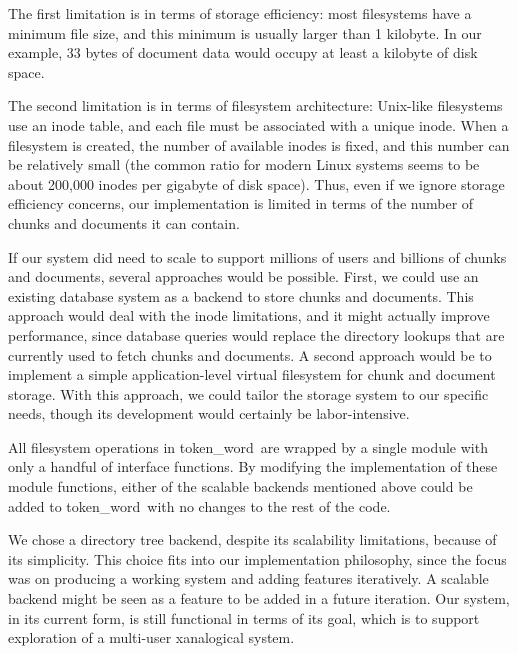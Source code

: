 \documentclass{acm_proc_article-sp}
\newcommand{\tokenWord}{token\_word}
\begin{document}
The first limitation is in terms of storage efficiency:  most filesystems have a minimum file size, and this minimum is usually larger than 1 kilobyte.
In our example, 33 bytes of document data would occupy at least a kilobyte of disk space.

The second limitation is in terms of filesystem architecture:  Unix-like filesystems use an inode table, and each file must be associated with a unique inode.
When a filesystem is created, the number of available inodes is fixed, and this number can be relatively small (the common ratio for modern Linux systems seems to be about 200,000 inodes per gigabyte of disk space). \cite{OperatingSystems}
Thus, even if we ignore storage efficiency concerns, our implementation is limited in terms of the number of chunks and documents it can contain.

If our system did need to scale to support millions of users and billions of chunks and documents, several approaches would be possible.
First, we could use an existing database system as a backend to store chunks and documents.
This approach would deal with the inode limitations, and it might actually improve performance, since database queries would replace the directory lookups that are currently used to fetch chunks and documents.
A second approach would be to implement a simple application-level virtual filesystem for chunk and document storage.
With this approach, we could tailor the storage system to our specific needs, though its development would certainly be labor-intensive.

All filesystem operations in \tokenWord \  are wrapped by a single module with only a handful of interface functions.
By modifying the implementation of these module functions, either of the scalable backends mentioned above could be added to \tokenWord \  with no changes to the rest of the code. 

We chose a directory tree backend, despite its scalability limitations, because of its simplicity.
This choice fits into our implementation philosophy, since the focus was on producing a working system and adding features iteratively.
A scalable backend might be seen as a feature to be added in a future iteration.
Our system, in its current form, is still functional in terms of its goal, which is to support exploration of a multi-user xanalogical system.

\end{document}
